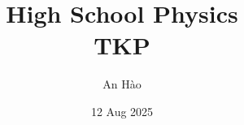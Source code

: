 \usepackage[utf8]{inputenc}
\usepackage[T1]{fontenc}

\usepackage{blindtext} %
\usepackage{color,soul} %
\usepackage[dvipsnames]{xcolor} %
\usepackage{tcolorbox}

\usepackage{amsmath, booktabs}
\usepackage{amsthm}
\usepackage{amssymb}
\usepackage{amsfonts}
\usepackage{mathtools}

\usepackage{graphicx}
\usepackage{subcaption}
\graphicspath{ {./figures/} }


\usepackage{tikz}



\usepackage[
  left=20mm,
  right=20mm,
  top=25mm,
  bottom=25mm,
  headsep=10mm,
  footskip=15mm,
]{geometry}

\usepackage{fancyhdr}
\usepackage{lastpage}

\pagestyle{fancy}
\fancyhf{} %
\renewcommand{\headrulewidth}{0pt} %

\lhead{\leftmark}
\rhead{\thepage}

\renewcommand{\baselinestretch}{1.2}

\setlength{\parskip}{1.3mm}

\usepackage[vietnamese=nohyphenation]{hyphsubst} %
\usepackage[vietnamese]{babel}

\usepackage{hyperref} %
    

\usepackage[Glenn]{fncychap}

\usepackage{subfiles} %

\title{
	{High School Physics}\\
	{\large TKP}\\
}
\author{An Hào}
\date{12 Aug 2025}
